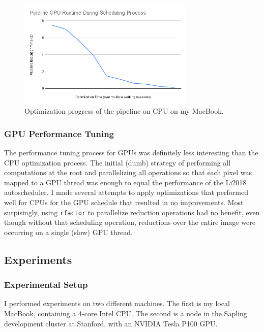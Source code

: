 \documentclass{article}
\begin{document}
\begin{figure}
    \centering
    \includegraphics[width=0.75\textwidth]{cpu_opti_graph}
    \caption{Optimization progress of the pipeline on CPU on my MacBook.}
    \label{fig:opti}
\end{figure}

\subsubsection{GPU Performance Tuning}

The performance tuning process for GPUs was definitely less interesting than the CPU optimization process.
%
The initial (dumb) strategy of performing all computations at the root and parallelizing all operations so that
each pixel was mapped to a GPU thread was enough to equal the performance of the Li2018 autoscheduler.
%
I made several attempts to apply optimizations that performed well for CPUs for the GPU schedule that resulted
in no improvements.
%
Most surpisingly, using \texttt{rfactor} to parallelize reduction operations had no benefit, even though without
that scheduling operation, reductions over the entire image were occurring on a single (slow) GPU thread.

\subsection{Experiments}

\subsubsection{Experimental Setup}

I performed experiments on two different machines. The first is my local MacBook, containing a 4-core Intel CPU. 
%
The second is a node in the Sapling development cluster at Stanford, with an NVIDIA Tesla P100 GPU.
\end{document}
